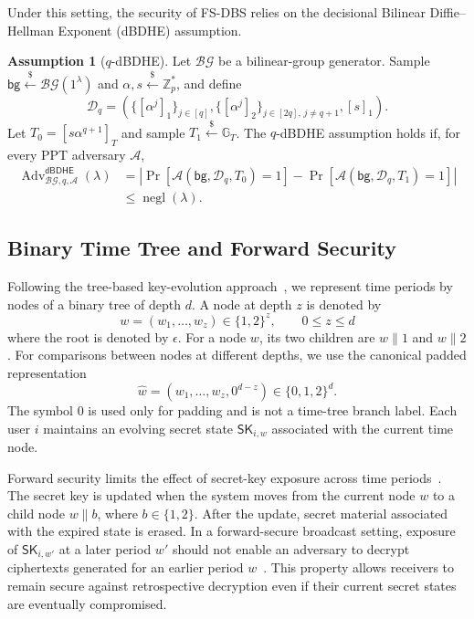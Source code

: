 \documentclass[sigconf,anonymous]{acmart}
\theoremstyle{definition}
\theoremstyle{definition}
\theoremstyle{definition}
\theoremstyle{definition}
\theoremstyle{definition}
\theoremstyle{definition}
\theoremstyle{definition}
\theoremstyle{definition}
\newtheorem{assumption}{Assumption}
\theoremstyle{definition}
\begin{document}
Under this setting, the security of FS-DBS relies on the decisional Bilinear Diffie--Hellman Exponent (dBDHE) assumption.

\begin{assumption}[$q$-dBDHE]
	Let $\mathcal{BG}$ be a bilinear-group generator. Sample
	$\mathsf{bg}\overset{\$}{\leftarrow}\mathcal{BG}(1^\lambda)$ and
	$\alpha,s\overset{\$}{\leftarrow}\mathbb{Z}_p^*$, and define
	\[
	\mathcal{D}_q=
	\left(
	\{[\alpha^j]_1\}_{j\in[q]},
	\{[\alpha^j]_2\}_{j\in[2q],\,j\neq q+1},
	[s]_1
	\right).
	\]
	Let $T_0=[s\alpha^{q+1}]_T$ and sample
	$T_1\overset{\$}{\leftarrow}\mathbb{G}_T$. The $q$-dBDHE
	assumption holds if, for every PPT adversary $\mathcal{A}$,
	\[
	\begin{aligned}
	\operatorname{Adv}^{\mathsf{dBDHE}}_{\mathcal{BG},q,\mathcal{A}}(\lambda)
	&=
	\left|
	\Pr[\mathcal{A}(\mathsf{bg},\mathcal{D}_q,T_0)=1]
	-
	\Pr[\mathcal{A}(\mathsf{bg},\mathcal{D}_q,T_1)=1]
	\right|\\
	&\leq \operatorname{negl}(\lambda).
	\end{aligned}
	\]
\end{assumption}
\subsection{Binary Time Tree and Forward Security}

Following the tree-based key-evolution approach~\cite{canetti2003forward,attrapadung2006forward}, we represent time periods by nodes of a binary tree of depth $d$. A node at depth $z$ is denoted by
\[
w=(w_1,\ldots,w_z)\in\{1,2\}^z,\qquad 0\leq z\leq d
\]
where the root is denoted by $\epsilon$. For a node $w$, its two children are $w\|1$ and $w\|2$. For comparisons between nodes at different depths, we use the canonical padded representation
\[
\widehat{w}=(w_1,\ldots,w_z,0^{d-z})\in\{0,1,2\}^{d}.
\]
The symbol $0$ is used only for padding and is not a time-tree branch label. Each user $i$ maintains an evolving secret state $\mathsf{SK}_{i,w}$ associated with the current time node.

Forward security limits the effect of secret-key exposure across time periods~\cite{canetti2003forward}. The secret key is updated when the system moves from the current node $w$ to a child node $w\|b$, where $b\in\{1,2\}$. After the update, secret material associated with the expired state is erased. In a forward-secure broadcast setting, exposure of $\mathsf{SK}_{i,w'}$ at a later period $w'$ should not enable an adversary to decrypt ciphertexts generated for an earlier period $w$~\cite{attrapadung2006forward}. This property allows receivers to remain secure against retrospective decryption even if their current secret states are eventually compromised.
\end{document}
